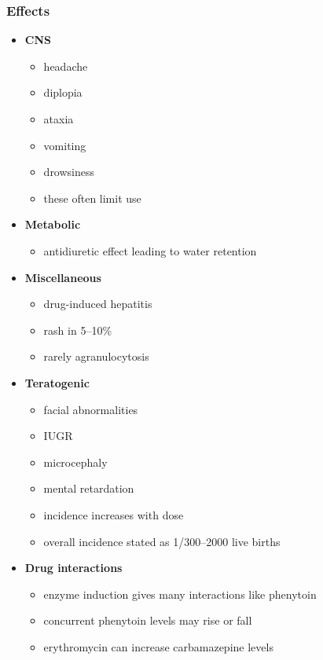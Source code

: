 \documentclass[11pt,a4paper]{article}
\begin{document}
\subsubsection{Effects}
\begin{itemize}
  \item \textbf{CNS}
  \begin{itemize}
    \item headache
    \item diplopia
    \item ataxia
    \item vomiting
    \item drowsiness
    \item these often limit use
  \end{itemize}
  \item \textbf{Metabolic}
  \begin{itemize}
    \item antidiuretic effect leading to water retention
  \end{itemize}
  \item \textbf{Miscellaneous}
  \begin{itemize}
    \item drug-induced hepatitis
    \item rash in 5--10\%
    \item rarely agranulocytosis
  \end{itemize}
  \item \textbf{Teratogenic}
  \begin{itemize}
    \item facial abnormalities
    \item IUGR
    \item microcephaly
    \item mental retardation
    \item incidence increases with dose
    \item overall incidence stated as 1/300--2000 live births
  \end{itemize}
  \item \textbf{Drug interactions}
  \begin{itemize}
    \item enzyme induction gives many interactions like phenytoin
    \item concurrent phenytoin levels may rise or fall
    \item erythromycin can increase carbamazepine levels
  \end{itemize}
\end{itemize}
\end{document}
